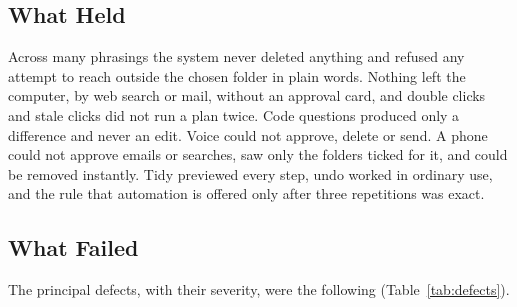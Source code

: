 \documentclass{FastFyp}
\begin{document}
\subsection{What Held}
Across many phrasings the system never deleted anything and refused any attempt to reach outside the chosen folder in plain words. Nothing left the computer, by web search or mail, without an approval card, and double clicks and stale clicks did not run a plan twice. Code questions produced only a difference and never an edit. Voice could not approve, delete or send. A phone could not approve emails or searches, saw only the folders ticked for it, and could be removed instantly. Tidy previewed every step, undo worked in ordinary use, and the rule that automation is offered only after three repetitions was exact.


\subsection{What Failed}
The principal defects, with their severity, were the following (Table~\ref{tab:defects}).
\end{document}
